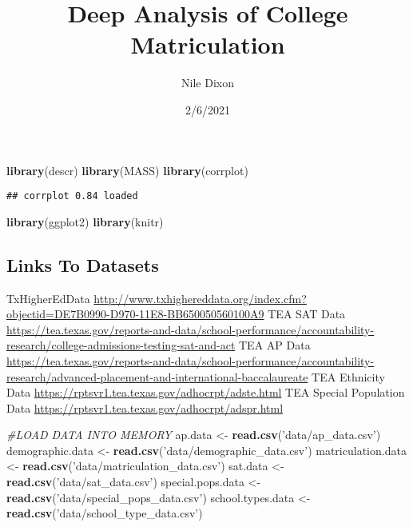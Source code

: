 \documentclass[
]{article}
\title{Deep Analysis of College Matriculation}
\author{Nile Dixon}
\date{2/6/2021}
\newenvironment{Shaded}{\begin{snugshade}}{\end{snugshade}}
\newcommand{\CommentTok}[1]{\textcolor[rgb]{0.56,0.35,0.01}{\textit{#1}}}
\newcommand{\KeywordTok}[1]{\textcolor[rgb]{0.13,0.29,0.53}{\textbf{#1}}}
\newcommand{\NormalTok}[1]{#1}
\newcommand{\StringTok}[1]{\textcolor[rgb]{0.31,0.60,0.02}{#1}}
\begin{document}
\maketitle

\begin{Shaded}
\begin{Highlighting}[]
\KeywordTok{library}\NormalTok{(descr)}
\KeywordTok{library}\NormalTok{(MASS)}
\KeywordTok{library}\NormalTok{(corrplot)}
\end{Highlighting}
\end{Shaded}

\begin{verbatim}
## corrplot 0.84 loaded
\end{verbatim}

\begin{Shaded}
\begin{Highlighting}[]
\KeywordTok{library}\NormalTok{(ggplot2)}
\KeywordTok{library}\NormalTok{(knitr)}
\end{Highlighting}
\end{Shaded}

\hypertarget{links-to-datasets}{%
\subsection{Links To Datasets}\label{links-to-datasets}}

TxHigherEdData
\url{http://www.txhighereddata.org/index.cfm?objectid=DE7B0990-D970-11E8-BB650050560100A9}
TEA SAT Data
\url{https://tea.texas.gov/reports-and-data/school-performance/accountability-research/college-admissions-testing-sat-and-act}
TEA AP Data
\url{https://tea.texas.gov/reports-and-data/school-performance/accountability-research/advanced-placement-and-international-baccalaureate}
TEA Ethnicity Data
\url{https://rptsvr1.tea.texas.gov/adhocrpt/adste.html} TEA Special
Population Data \url{https://rptsvr1.tea.texas.gov/adhocrpt/adspr.html}

\begin{Shaded}
\begin{Highlighting}[]
\CommentTok{#LOAD DATA INTO MEMORY}
\NormalTok{ap.data <-}\StringTok{ }\KeywordTok{read.csv}\NormalTok{(}\StringTok{'data/ap_data.csv'}\NormalTok{)}
\NormalTok{demographic.data <-}\StringTok{ }\KeywordTok{read.csv}\NormalTok{(}\StringTok{'data/demographic_data.csv'}\NormalTok{)}
\NormalTok{matriculation.data <-}\StringTok{ }\KeywordTok{read.csv}\NormalTok{(}\StringTok{'data/matriculation_data.csv'}\NormalTok{)}
\NormalTok{sat.data <-}\StringTok{ }\KeywordTok{read.csv}\NormalTok{(}\StringTok{'data/sat_data.csv'}\NormalTok{)}
\NormalTok{special.pops.data <-}\StringTok{ }\KeywordTok{read.csv}\NormalTok{(}\StringTok{'data/special_pops_data.csv'}\NormalTok{)}
\NormalTok{school.types.data <-}\StringTok{ }\KeywordTok{read.csv}\NormalTok{(}\StringTok{'data/school_type_data.csv'}\NormalTok{)}
\end{Highlighting}
\end{Shaded}
\end{document}
